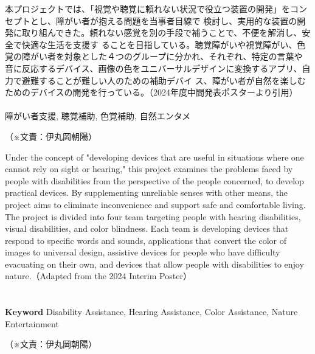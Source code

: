 \documentclass[11pt,a4paper]{report}
\newcommand{\Writer}[1]{
  \normalsize
  \begin{flushright}
    （※文責：#1）
  \end{flushright}
}
\begin{document}
{
    \centerline{
      \huge{}
    }
    \vspace{1cm}
    \noindent\space
    本プロジェクトでは、「視覚や聴覚に頼れない状況で役立つ装置の開発」をコンセプトとし、障がい者が抱える問題を当事者目線で
検討し、実用的な装置の開発に取り組んできた。頼れない感覚を別の手段で補うことで、不便を解消し、安全で快適な生活を支援す
ることを目指している。聴覚障がいや視覚障がい、色覚の障がい者を対象とした４つのグループに分かれ、それぞれ、特定の言葉や
音に反応するデバイス、画像の色をユニバーサルデザインに変換するアプリ、自力で避難することが難しい人のための補助デバイ
ス、障がい者が自然を楽しむためのデバイスの開発を行っている。（2024年度中間発表ポスターより引用\cite{概要}）\\
\\
\noindent{} \indent 障がい者支援, 聴覚補助, 色覚補助, 自然エンタメ
\Writer{伊丸岡朝陽}

}
\newpage
{
    \centerline{
      \textbf{\huge{}}
    }
    \vspace{1cm}
    \noindent\space
    Under the concept of "developing devices that are useful in situations where one cannot rely on sight or hearing," this project examines the
problems faced by people with disabilities from the perspective of the people concerned, to develop practical devices. By supplementing
unreliable senses with other means, the project aims to eliminate inconvenience and support safe and comfortable living. The project is
divided into four team targeting people with hearing disabilities, visual disabilities, and color blindness. Each team is developing devices that
respond to specific words and sounds, applications that convert the color of images to universal design, assistive devices for people who
have difficulty evacuating on their own, and devices that allow people with disabilities to enjoy nature.（Adapted from the 2024 Interim Poster\cite{概要}）\\\\
\\
\noindent\textbf{\textsf{Keyword}} \indent Disability Assistance, Hearing Assistance, Color Assistance, Nature Entertainment
\Writer{伊丸岡朝陽}

}
\newpage

\tableofcontents %
\newpage

\pagestyle{fancy}
\fancyhead{} %
\end{document}
